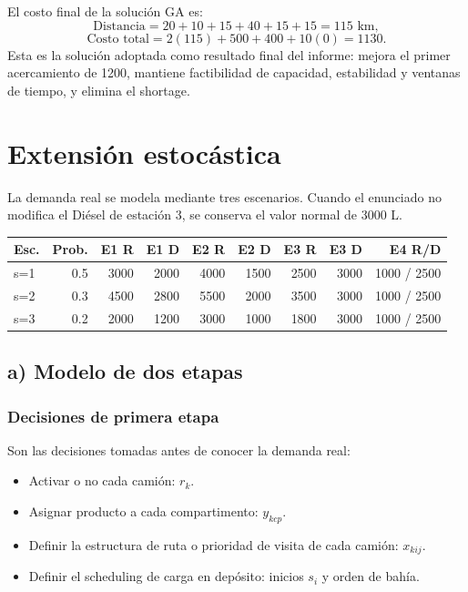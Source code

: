 \documentclass[11pt,letterpaper]{article}
\begin{document}
El costo final de la solución GA es:
\[
\text{Distancia}=20+10+15+40+15+15=115\text{ km},
\]
\[
\text{Costo total}=2(115)+500+400+10(0)=1130.
\]
Esta es la solución adoptada como resultado final del informe: mejora el primer acercamiento
de 1200, mantiene factibilidad de capacidad, estabilidad y ventanas de tiempo, y elimina el
shortage.

\section{Extensión estocástica}

La demanda real se modela mediante tres escenarios. Cuando el enunciado no modifica el Diésel
de estación 3, se conserva el valor normal de 3000 L.

\begin{table}[h]
\centering
\begin{tabular}{lrrrrrrrr}
\toprule
\textbf{Esc.} & \textbf{Prob.} & \textbf{E1 R} & \textbf{E1 D} & \textbf{E2 R} & \textbf{E2 D} & \textbf{E3 R} & \textbf{E3 D} & \textbf{E4 R/D} \\
\midrule
s=1 & 0.5 & 3000 & 2000 & 4000 & 1500 & 2500 & 3000 & 1000 / 2500 \\
s=2 & 0.3 & 4500 & 2800 & 5500 & 2000 & 3500 & 3000 & 1000 / 2500 \\
s=3 & 0.2 & 2000 & 1200 & 3000 & 1000 & 1800 & 3000 & 1000 / 2500 \\
\bottomrule
\end{tabular}
\end{table}

\subsection{a) Modelo de dos etapas}

\subsubsection*{Decisiones de primera etapa}
Son las decisiones tomadas antes de conocer la demanda real:
\begin{itemize}[leftmargin=*]
    \item Activar o no cada camión: \(r_k\).
    \item Asignar producto a cada compartimento: \(y_{kcp}\).
    \item Definir la estructura de ruta o prioridad de visita de cada camión: \(x_{kij}\).
    \item Definir el scheduling de carga en depósito: inicios \(s_i\) y orden de bahía.
\end{itemize}
\end{document}
